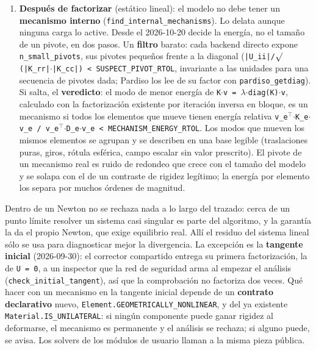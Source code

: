\documentclass[11pt,oneside]{report}
\begin{document}
\begin{enumerate}
  \item \textbf{Después de factorizar} (estático lineal): el modelo no debe tener un \textbf{mecanismo interno} (\texttt{find\_\allowbreak{}internal\_\allowbreak{}mechanisms}). Lo delata aunque ninguna carga lo active. Desde el 2026-10-20 decide la energía, no el tamaño de un pivote, en dos pasos. Un \textbf{filtro} barato: cada backend directo expone \texttt{n\_small\_pivots}, sus pivotes pequeños frente a la diagonal (\texttt{|U\_\allowbreak{}ii|/\allowbreak{}\ensuremath{\surd}(|K\_\allowbreak{}rr|\ensuremath{\cdot}|K\_\allowbreak{}cc|) \textless{} SUSPECT\_\allowbreak{}PIVOT\_\allowbreak{}RTOL}, invariante a las unidades para una secuencia de pivotes dada; Pardiso los lee de su factor con \texttt{pardiso\_getdiag}). Si salta, el \textbf{veredicto}: el modo de menor energía de \texttt{K\ensuremath{\cdot}v = \ensuremath{\lambda}\ensuremath{\cdot}diag(K)\ensuremath{\cdot}v}, calculado con la factorización existente por iteración inversa en bloque, es un mecanismo si todos los elementos que mueve tienen energía relativa \texttt{v\_\allowbreak{}e\ensuremath{^{\top}}\ensuremath{\cdot}K\_\allowbreak{}e\ensuremath{\cdot}v\_\allowbreak{}e /\allowbreak{} v\_\allowbreak{}e\ensuremath{^{\top}}\ensuremath{\cdot}D\_\allowbreak{}e\ensuremath{\cdot}v\_\allowbreak{}e \textless{} MECHANISM\_\allowbreak{}ENERGY\_\allowbreak{}RTOL}. Los modos que mueven los mismos elementos se agrupan y se describen en una base legible (traslaciones puras, giros, rótula esférica, campo escalar sin valor prescrito). El pivote de un mecanismo real es ruido de redondeo que crece con el tamaño del modelo y se solapa con el de un contraste de rigidez legítimo; la energía por elemento los separa por muchos órdenes de magnitud.
\end{enumerate}

Dentro de un Newton no se rechaza nada a lo largo del trazado: cerca de un punto límite resolver un sistema casi singular es parte del algoritmo, y la garantía la da el propio Newton, que exige equilibrio real. Allí el residuo del sistema lineal sólo se usa para diagnosticar mejor la divergencia. La excepción es la \textbf{tangente inicial} (2026-09-30): el corrector compartido entrega su primera factorización, la de \texttt{U = 0}, a un inspector que la red de seguridad arma al empezar el análisis (\texttt{check\_\allowbreak{}initial\_\allowbreak{}tangent}), así que la comprobación no factoriza dos veces. Qué hacer con un mecanismo en la tangente inicial depende de un \textbf{contrato declarativo} nuevo, \texttt{Element.\allowbreak{}GEOMETRICALLY\_\allowbreak{}NONLINEAR}, y del ya existente \texttt{Material.\allowbreak{}IS\_\allowbreak{}UNILATERAL}: si ningún componente puede ganar rigidez al deformarse, el mecanismo es permanente y el análisis se rechaza; si alguno puede, se avisa. Los solvers de los módulos de usuario llaman a la misma pieza pública.
\end{document}
